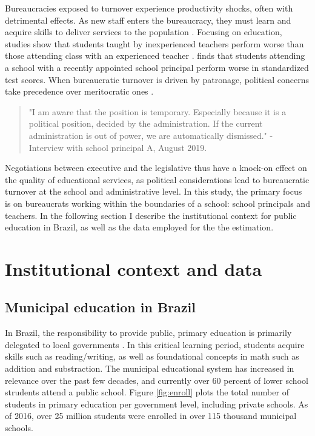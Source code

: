 \documentclass[12pt,a4paper]{article}
\begin{document}
Bureaucracies exposed to turnover experience productivity shocks, often with detrimental effects. As new staff enters the bureaucracy, they must learn and acquire skills to deliver services to the population \citet{gailmard_slackers_2007}. Focusing on education, studies show that students taught by inexperienced teachers perform worse than those attending class with an experienced teacher \citet{clotfelter_teacher_2007}. \citet{akhtari_political_2015} finds that students attending a school with a recently appointed school principal perform worse in standardized test scores. When bureaucratic turnover is driven by patronage, political concerns take precedence over meritocratic ones \citet{colonnelli_patronage_2017}.

\begin{quote}
"I am aware that the position is temporary. Especially because it is a political position, decided by the administration. If the current administration is out of power, we are automatically dismissed." - Interview with school principal A, August 2019.
\end{quote}

Negotiations between executive and the legislative thus have a knock-on effect on the quality of educational services, as political considerations lead to bureaucratic turnover at the school and administrative level. In this study, the primary focus is on bureaucrats working within the boundaries of a school: school principals and teachers. In the following section I describe the institutional context for public education in Brazil, as well as the data employed for the the estimation.

\section{Institutional context and data}
\label{sec:context}

\subsection{Municipal education in Brazil}

In Brazil, the responsibility to provide public, primary education is primarily delegated to local governments \citet{paschoal_historia_2009}. In this critical learning period, students acquire skills such as reading/writing, as well as foundational concepts in math such as addition and substraction. The municipal educational system has increased in relevance over the past few decades, and currently over 60 percent of lower school strudents attend a public school. Figure \ref{fig:enroll} plots the total number of students in primary education per government level, including private schools. As of 2016, over 25 million students were enrolled in over 115 thousand municipal schools.
\end{document}
